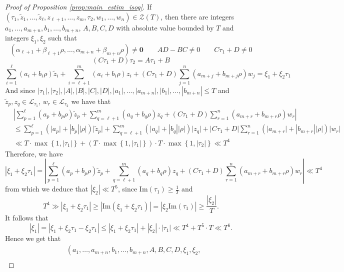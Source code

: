 \documentclass[10pt,a4paper]{amsart}
\newcommand{\abs}[1]{\left| #1 \right|}
\newcommand{\pg}[1]{\left\lbrace #1 \right\rbrace}
\newcommand{\pt}[1]{\left( #1 \right)}
\renewcommand{\Im}{\mathrm{Im}}
\renewcommand{\a}{\alpha}
\renewcommand{\b}{\beta}
\renewcommand{\r}{\rho}
\begin{document}
\begin{proof}[Proof of Proposition \ref{prop:main_estim_isog}]
If $(\tau_1,\widetilde{z}_1,\ldots,\widetilde{z}_{\ell}, z_{\ell+1}, \ldots, z_m, \tau_2, w_1, \ldots, w_n) \in \mathcal{Z}(T)$, then there are integers $ a_1, \ldots, a_{m+n},b_1, \ldots, b_{m+n}$, $A,B,C,D $ with absolute value bounded by $T$ and integers $\xi_1, \xi_2$ such that 
\[ \pt{\a_{\ell+1}+\b_{\ell+1} \r, \ldots,\a_{m+n}+ \b_{m+n} \r}\neq \mathbf{0} \qquad AD - BC \neq 0  \qquad C\tau_1 + D \neq 0 \]
\[ \pt{C\tau_1+D}\tau_2=A\tau_1+B \]
\[ \sum\limits_{i=1}^{\ell}(a_i+b_i \r)\widetilde{z}_i + \sum\limits_{i=\ell+1}^{m}(a_i+b_i \r)z_i+\pt{C\tau_1+D}\sum\limits_{j=1}^{n}(a_{m+j}+b_{m+j}\r)w_j=\xi_1+\xi_2 \tau_1\]
And since $ \lvert \tau_1 \rvert, \lvert \tau_2 \rvert, \lvert A \rvert, \lvert B \rvert, \lvert C \rvert, \lvert D \rvert, \lvert a_{1} \rvert, \ldots,  \lvert a_{m+n} \rvert, \abs{b_{1}}, \ldots, \abs{b_{m+n}}\leq T$ and $\widetilde{z}_p, z_{q} \in \mathcal{L}_{\tau_1}$, $w_r \in \mathcal{L}_{\tau_2}$ we have that
\begin{align*}
&\left| \sum\limits_{p=1}^{\ell}(a_p+b_p \r)\widetilde{z}_p + \sum\limits_{q=\ell+1}^{m} (a_q +b_q \r)z_q + (C\tau_1+D)\sum\limits_{r=1}^{n} (a_{m+r}+b_{m+r}\r) w_r \right|\\
 &\leq \sum\limits_{p=1}^{\ell} \pt{\lvert a_p \rvert+ \abs{b_p} \abs{\r}}  \lvert \widetilde{z}_p \rvert + \sum\limits_{q=\ell+1}^{m} \pt{\lvert a_q \rvert+ \abs{b_q} \abs{\r}}  \lvert z_q \rvert + \lvert C\tau_1+D \rvert \sum\limits_{r=1}^{n} \pt{\lvert a_{m+r} \rvert +\abs{b_{m+r}}\abs{\r}} \lvert w_r \rvert \\
&\ll T \cdot \max \pg{1, \lvert \tau_1 \rvert}+ (T\cdot \max\pg{1, \abs{\tau_1}}) \cdot T \cdot \max \pg{1, \lvert \tau_2 \rvert} \ll T^4
\end{align*}
Therefore, we have 
$$\abs{\xi_1+ \xi_2\tau_1}=\abs{\sum\limits_{p=1}^{\ell}(a_p+b_p \r)\widetilde{z}_p + \sum\limits_{q=\ell+1}^{m} (a_q +b_q \r)z_q + (C\tau_1+D)\sum\limits_{r=1}^{n} (a_{m+r}+b_{m+r}\r) w_r}\ll T^4$$
from which we deduce that $\abs{\xi_2}\ll T^5$, since $\Im(\tau_1)\geq \frac{1}{T}$ and
$$T^4 \gg \abs{\xi_1+ \xi_2\tau_1} \geq \abs{\Im(\xi_1+ \xi_2\tau_1)}=\abs{\xi_2 \Im(\tau_1)}\geq \frac{\abs{\xi_2}}{T}.$$
It follows that $$\abs{\xi_1}=\abs{\xi_1+\xi_2\tau_1-\xi_2\tau_1}\leq \abs{\xi_1+\xi_2\tau_1}+\abs{\xi_2}\cdot \abs{\tau_1} \ll T^4+ T^5 \cdot T \ll T^6.$$
Hence we get that 
\begin{align*}
& \left( a_1, \ldots, a_{m+n},b_1, \ldots, b_{m+n}, A,B,C,D, \xi_1, \xi_2,\right. \\

\end{align*}
\end{proof}
\end{document}
